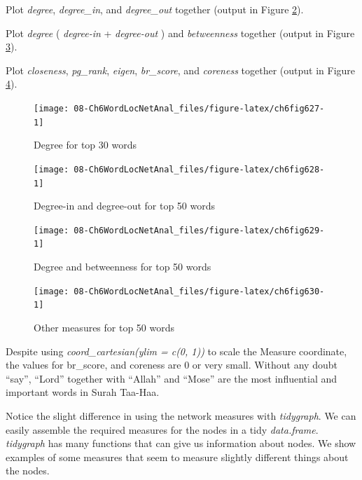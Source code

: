 \documentclass[
]{article}
\begin{document}
Plot \emph{degree}, \emph{degree\_in}, and \emph{degree\_out} together (output in Figure \ref{fig:ch6fig628}).

Plot \emph{degree} ( \emph{degree-in} + \emph{degree-out} ) and \emph{betweenness} together (output in Figure \ref{fig:ch6fig629}).

Plot \emph{closeness}, \emph{pg\_rank}, \emph{eigen}, \emph{br\_score}, and \emph{coreness} together (output in Figure \ref{fig:ch6fig630}).

\begin{figure}

{\centering \texttt{[image: 08-Ch6WordLocNetAnal\_files/figure-latex/ch6fig627-1]} 

}

\caption{Degree for top 30 words}\label{fig:ch6fig627}
\end{figure}

\begin{figure}

{\centering \texttt{[image: 08-Ch6WordLocNetAnal\_files/figure-latex/ch6fig628-1]} 

}

\caption{Degree-in and degree-out for top 50 words}\label{fig:ch6fig628}
\end{figure}

\begin{figure}

{\centering \texttt{[image: 08-Ch6WordLocNetAnal\_files/figure-latex/ch6fig629-1]} 

}

\caption{Degree and betweenness for top 50 words}\label{fig:ch6fig629}
\end{figure}

\begin{figure}

{\centering \texttt{[image: 08-Ch6WordLocNetAnal\_files/figure-latex/ch6fig630-1]} 

}

\caption{Other measures for top 50 words}\label{fig:ch6fig630}
\end{figure}

Despite using \emph{coord\_cartesian(ylim = c(0, 1))} to scale the Measure coordinate, the values for br\_score, and coreness are 0 or very small. Without any doubt ``say'', ``Lord'' together with ``Allah'' and ``Mose'' are the most influential and important words in Surah Taa-Haa.

Notice the slight difference in using the network measures with \emph{tidygraph}. We can easily assemble the required measures for the nodes in a tidy \emph{data.frame}. \emph{tidygraph} has many functions that can give us information about nodes. We show examples of some measures that seem to measure slightly different things about the nodes.
\end{document}
